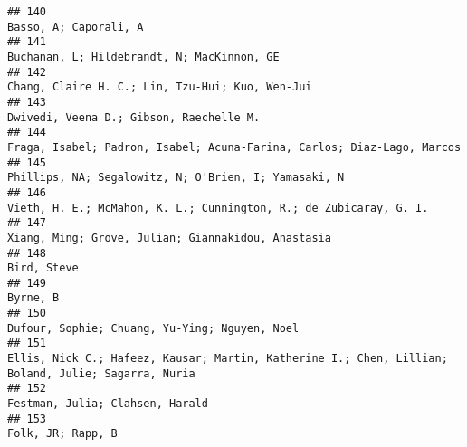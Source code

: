 \documentclass[
  english,
  man]{apa6}
\begin{document}
\begin{verbatim}
## 140                                                                                                                                                                    Basso, A; Caporali, A
## 141                                                                                                                                               Buchanan, L; Hildebrandt, N; MacKinnon, GE
## 142                                                                                                                                          Chang, Claire H. C.; Lin, Tzu-Hui; Kuo, Wen-Jui
## 143                                                                                                                                                  Dwivedi, Veena D.; Gibson, Raechelle M.
## 144                                                                                                                   Fraga, Isabel; Padron, Isabel; Acuna-Farina, Carlos; Diaz-Lago, Marcos
## 145                                                                                                                                     Phillips, NA; Segalowitz, N; O'Brien, I; Yamasaki, N
## 146                                                                                                                        Vieth, H. E.; McMahon, K. L.; Cunnington, R.; de Zubicaray, G. I.
## 147                                                                                                                                       Xiang, Ming; Grove, Julian; Giannakidou, Anastasia
## 148                                                                                                                                                                              Bird, Steve
## 149                                                                                                                                                                                 Byrne, B
## 150                                                                                                                                            Dufour, Sophie; Chuang, Yu-Ying; Nguyen, Noel
## 151                                                                                       Ellis, Nick C.; Hafeez, Kausar; Martin, Katherine I.; Chen, Lillian; Boland, Julie; Sagarra, Nuria
## 152                                                                                                                                                          Festman, Julia; Clahsen, Harald
## 153                                                                                                                                                                        Folk, JR; Rapp, B

\end{verbatim}
\end{document}
